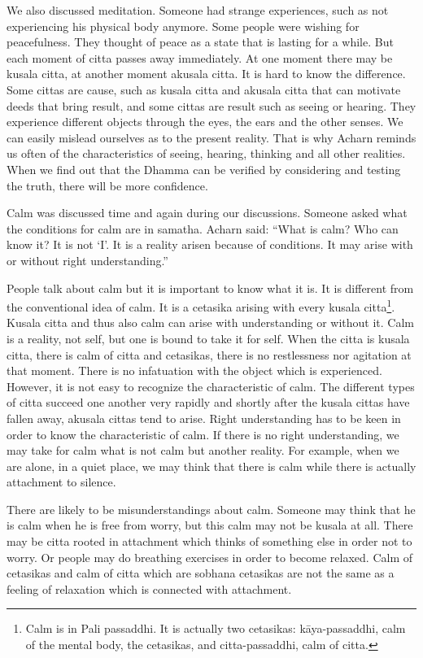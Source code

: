 We also discussed meditation. Someone had strange experiences, such as
not experiencing his physical body anymore. Some people were wishing for
peacefulness. They thought of peace as a state that is lasting for a
while. But each moment of citta passes away immediately. At one moment
there may be kusala citta, at another moment akusala citta. It is hard
to know the difference. Some cittas are cause, such as kusala citta and
akusala citta that can motivate deeds that bring result, and some cittas
are result such as seeing or hearing. They experience different objects
through the eyes, the ears and the other senses. We can easily mislead
ourselves as to the present reality. That is why Acharn reminds us often
of the characteristics of seeing, hearing, thinking and all other
realities. When we find out that the Dhamma can be verified by
considering and testing the truth, there will be more confidence.

Calm was discussed time and again during our discussions. Someone asked
what the conditions for calm are in samatha. Acharn said: ``What is
calm? Who can know it? It is not `I'. It is a reality arisen because of
conditions. It may arise with or without right understanding.''

People talk about calm but it is important to know what it is. It is
different from the conventional idea of calm. It is a cetasika arising
with every kusala citta\footnote{Calm is in Pali
passaddhi. It is actually two cetasikas: kāya-passaddhi, calm of the
mental body, the cetasikas, and citta-passaddhi, calm of citta.}.
Kusala citta and thus also calm can arise with understanding or without
it. Calm is a reality, not self, but one is bound to take it for self.
When the citta is kusala citta, there is calm of citta and cetasikas,
there is no restlessness nor agitation at that moment. There is no
infatuation with the object which is experienced. However, it is not
easy to recognize the characteristic of calm. The different types of
citta succeed one another very rapidly and shortly after the kusala
cittas have fallen away, akusala cittas tend to arise. Right
understanding has to be keen in order to know the characteristic of
calm. If there is no right understanding, we may take for calm what is
not calm but another reality. For example, when we are alone, in a quiet
place, we may think that there is calm while there is actually
attachment to silence.

There are likely to be misunderstandings about calm. Someone may think
that he is calm when he is free from worry, but this calm may not be
kusala at all. There may be citta rooted in attachment which thinks of
something else in order not to worry. Or people may do breathing
exercises in order to become relaxed. Calm of cetasikas and calm of
citta which are sobhana cetasikas are not the same as a feeling of
relaxation which is connected with attachment.

